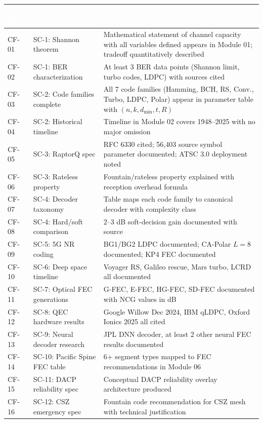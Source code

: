 \documentclass[11pt,letterpaper]{article}
\newcommand{\tableheader}[1]{\textbf{\sffamily\textcolor{white}{#1}}}
\begin{document}
\begin{center}
\begin{tabularx}{\textwidth}{L{1.5cm}L{3.5cm}X}
\toprule
{}
\tableheader{Test ID} & \tableheader{Success Criterion} & \tableheader{Verification Method} \\
\midrule
CF-01 & SC-1: Shannon theorem & Mathematical statement of channel capacity with all variables defined appears in Module 01; tradeoff quantitatively described \\
CF-02 & SC-1: BER characterization & At least 3 BER data points (Shannon limit, turbo codes, LDPC) with sources cited \\
CF-03 & SC-2: Code families complete & All 7 code families (Hamming, BCH, RS, Conv., Turbo, LDPC, Polar) appear in parameter table with $(n,k,d_{\min},t,R)$ \\
CF-04 & SC-2: Historical timeline & Timeline in Module 02 covers 1948--2025 with no major omission \\
CF-05 & SC-3: RaptorQ spec & RFC 6330 cited; 56,403 source symbol parameter documented; ATSC 3.0 deployment noted \\
CF-06 & SC-3: Rateless property & Fountain/rateless property explained with reception overhead formula \\
CF-07 & SC-4: Decoder taxonomy & Table maps each code family to canonical decoder with complexity class \\
CF-08 & SC-4: Hard/soft comparison & 2--3 dB soft-decision gain documented with source \\
CF-09 & SC-5: 5G NR coding & BG1/BG2 LDPC documented; CA-Polar $L=8$ documented; KP4 FEC documented \\
CF-10 & SC-6: Deep space timeline & Voyager RS, Galileo rescue, Mars turbo, LCRD all documented \\
CF-11 & SC-7: Optical FEC generations & G-FEC, E-FEC, HG-FEC, SD-FEC documented with NCG values in dB \\
CF-12 & SC-8: QEC hardware results & Google Willow Dec 2024, IBM qLDPC, Oxford Ionics 2025 all cited \\
CF-13 & SC-9: Neural decoder research & JPL DNN decoder, at least 2 other neural FEC results documented \\
CF-14 & SC-10: Pacific Spine FEC table & 6+ segment types mapped to FEC recommendations in Module 06 \\
CF-15 & SC-11: DACP reliability spec & Conceptual DACP reliability overlay architecture produced \\
CF-16 & SC-12: CSZ emergency spec & Fountain code recommendation for CSZ mesh with technical justification \\
\bottomrule
\end{tabularx}
\end{center}
\end{document}
